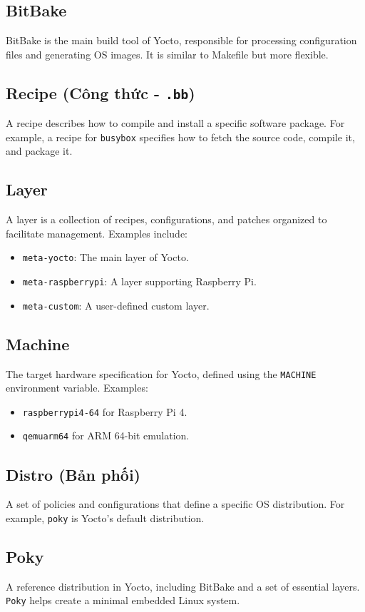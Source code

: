 \documentclass{article}
\begin{document}
\subsection{BitBake}
BitBake is the main build tool of Yocto, responsible for processing configuration files and generating OS images. It is similar to Makefile but more flexible.

\subsection{Recipe (Công thức - \texttt{.bb})}
A recipe describes how to compile and install a specific software package. For example, a recipe for \texttt{busybox} specifies how to fetch the source code, compile it, and package it.

\subsection{Layer}
A layer is a collection of recipes, configurations, and patches organized to facilitate management. Examples include:
\begin{itemize}
    \item \texttt{meta-yocto}: The main layer of Yocto.
    \item \texttt{meta-raspberrypi}: A layer supporting Raspberry Pi.
    \item \texttt{meta-custom}: A user-defined custom layer.
\end{itemize}

\subsection{Machine}
The target hardware specification for Yocto, defined using the \texttt{MACHINE} environment variable. Examples:
\begin{itemize}
    \item \texttt{raspberrypi4-64} for Raspberry Pi 4.
    \item \texttt{qemuarm64} for ARM 64-bit emulation.
\end{itemize}

\subsection{Distro (Bản phối)}
A set of policies and configurations that define a specific OS distribution. For example, \texttt{poky} is Yocto's default distribution.

\subsection{Poky}
A reference distribution in Yocto, including BitBake and a set of essential layers. \texttt{Poky} helps create a minimal embedded Linux system.
\end{document}
